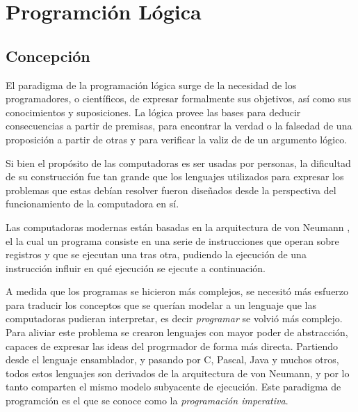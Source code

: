 \documentclass{article}
\begin{document}

\setcounter{page}{1}

\tableofcontents
\newpage



\clearpage	

\setlength{\parskip}{1ex plus 0.5ex minus 0.2ex}



\section{Programción Lógica}
\subsection{Concepción}

El paradigma de la programación lógica surge de la necesidad de los programadores, o científicos, de expresar formalmente sus objetivos, así como sus conocimientos y suposiciones. La lógica provee las bases para deducir consecuencias a partir de premisas, para encontrar la verdad o la falsedad de una proposición a partir de otras y para verificar la valiz de de un argumento lógico.

Si bien el propósito de las computadoras es ser usadas por personas, la dificultad de su construcción fue tan grande que los lenguajes utilizados para expresar los problemas que estas debían resolver fueron diseñados desde la perspectiva del funcionamiento de la computadora en sí.

Las computadoras modernas están basadas en la arquitectura de von Neumann \cite{vonneumann}, el la cual un programa consiste en una serie de instrucciones que operan sobre registros y que se ejecutan una tras otra, pudiendo la ejecución de una instrucción influir en qué ejecución se ejecute a continuación.

A medida que los programas se hicieron más complejos, se necesitó más esfuerzo para traducir los conceptos que se querían modelar a un lenguaje que las computadoras pudieran interpretar, es decir \emph{programar} se volvió más complejo. Para aliviar este problema se crearon lenguajes con mayor poder de abstracción, capaces de expresar las ideas del progrmador de forma más directa. Partiendo desde el lenguaje ensamblador, y pasando por C, Pascal, Java y muchos otros, todos estos lenguajes son derivados de la arquitectura de von Neumann, y por lo tanto comparten el mismo modelo subyacente de ejecución. Este paradigma de programción es el que se conoce como la \emph{programación imperativa}.
\end{document}
